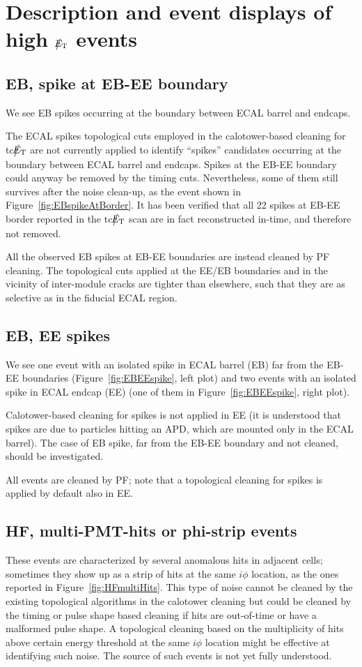 \section{Description and event displays of high $\big\slash\hspace{-1.6ex}{E_\text{T}}$ events} \label{EventDisplay}

\subsection{EB, spike at EB-EE boundary}
We see EB spikes occurring at the boundary between ECAL barrel and endcaps.

The ECAL spikes topological cuts employed in the calotower-based cleaning for tc$\big\slash\hspace{-1.6ex}{E_\text{T}}$ 
are not currently applied to identify ``spikes'' candidates occurring at the boundary between ECAL barrel and endcaps. 
Spikes at the EB-EE boundary could anyway be removed by the timing cuts. Nevertheless, some of them still survives 
after the noise clean-up, as the event shown in Figure~\ref{fig:EBspikeAtBorder}.
It has been verified that all 22 spikes at EB-EE border reported in the tc$\big\slash\hspace{-1.6ex}{E_\text{T}}$ scan are in fact reconstructed in-time, 
and therefore not removed.

All the observed EB spikes at EB-EE boundaries are instead cleaned by PF cleaning. 
The topological cuts applied at the EE/EB boundaries and in
the vicinity of inter-module cracks are tighter than elsewhere, such that they are 
as selective as in the fiducial ECAL region. 

\subsection{EB, EE spikes}
We see one event with an isolated spike in ECAL barrel (EB) far from the EB-EE boundaries 
(Figure~\ref{fig:EBEEspike}, left plot) and two events with an isolated spike in ECAL 
endcap (EE) (one of them in Figure~\ref{fig:EBEEspike}, right plot).

Calotower-based cleaning for spikes is not applied in EE (it is understood that 
spikes are due to particles hitting an APD, which are mounted only in the ECAL barrel). 
The case of EB spike, far from the EB-EE boundary and not cleaned, should be investigated.

All events are cleaned by PF; note that a topological cleaning for spikes is applied by default also in EE.

\subsection{HF, multi-PMT-hits or phi-strip events}
These events are characterized by several anomalous hits in adjacent cells; sometimes they show up as
a strip of hits at the same $i\phi$ location, as the ones reported in Figure~\ref{fig:HFmultiHits}. 
This type of noise cannot be cleaned by the existing topological algorithms in the calotower cleaning 
but could be cleaned by the timing or pulse shape based 
cleaning if hits are out-of-time or have a malformed pulse shape. 
A topological cleaning based on the multiplicity of hits above certain energy threshold 
at the same $i\phi$ location might be effective at identifying such noise.
The source of such events is not yet fully understood.

